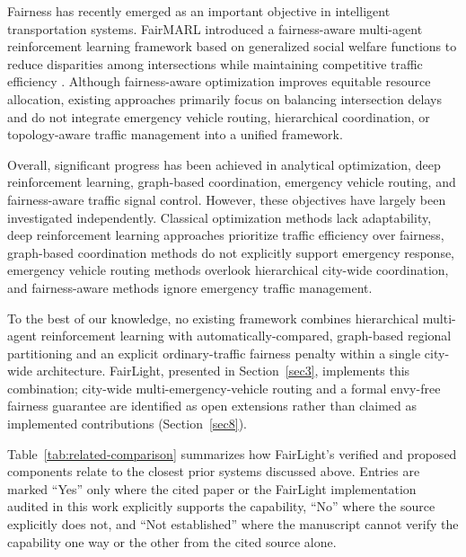 \documentclass[3p,times]{elsarticle}
\theoremstyle{plain}
\theoremstyle{definition}
\begin{document}
Fairness has recently emerged as an important objective in intelligent
transportation systems. FairMARL introduced a fairness-aware
multi-agent reinforcement learning framework based on generalized
social welfare functions to reduce disparities among intersections
while maintaining competitive traffic efficiency \cite{fairmarl}.
Although fairness-aware optimization improves equitable resource
allocation, existing approaches primarily focus on balancing
intersection delays and do not integrate emergency vehicle routing,
hierarchical coordination, or topology-aware traffic management into
a unified framework.

Overall, significant progress has been achieved in analytical
optimization, deep reinforcement learning, graph-based coordination,
emergency vehicle routing, and fairness-aware traffic signal control.
However, these objectives have largely been investigated independently.
Classical optimization methods lack adaptability, deep reinforcement
learning approaches prioritize traffic efficiency over fairness,
graph-based coordination methods do not explicitly support emergency
response, emergency vehicle routing methods overlook hierarchical
city-wide coordination, and fairness-aware methods ignore emergency
traffic management.

To the best of our knowledge, no existing framework combines
hierarchical multi-agent reinforcement learning with
automatically-compared, graph-based regional partitioning and an
explicit ordinary-traffic fairness penalty within a single city-wide
architecture. FairLight, presented in Section~\ref{sec3}, implements
this combination; city-wide multi-emergency-vehicle routing and a
formal envy-free fairness guarantee are identified as open extensions
rather than claimed as implemented contributions (Section~\ref{sec8}).

Table~\ref{tab:related-comparison} summarizes how FairLight's verified
and proposed components relate to the closest prior systems discussed
above. Entries are marked ``Yes'' only where the cited paper or the
FairLight implementation audited in this work explicitly supports the
capability, ``No'' where the source explicitly does not, and ``Not
established'' where the manuscript cannot verify the capability one way
or the other from the cited source alone.
\end{document}
